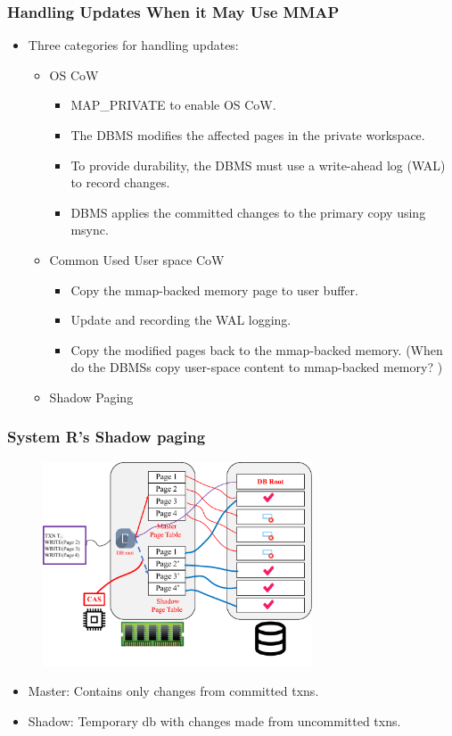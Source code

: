 \documentclass[10pt,svgnames,fragile]{beamer}
\begin{document}
\begin{frame}
	\frametitle{Handling Updates When it May Use MMAP}
	\begin{itemize}
		\item Three categories for handling updates:
		\begin{itemize}
			\item<1->[$\ast$] OS CoW
			\begin{itemize}
				\item<2->[\checkmark] MAP\_PRIVATE to enable OS CoW.
				\item<3->[\checkmark]The DBMS modifies the affected pages in the private workspace.
				\item<4->[\checkmark] To provide durability, the DBMS must use a write-ahead log (WAL) to record changes.
				\item<5->[\checkmark] DBMS applies the committed changes to the primary copy using msync.
			\end{itemize}
			\item<6->[$\ast$] Common Used User space CoW
			\begin{itemize}
				\item<7->[\checkmark] Copy the mmap-backed memory page to user buffer.
				\item<8->[\checkmark] Update and recording the WAL logging.
				\item<9->[\checkmark] Copy the modified pages back to the mmap-backed memory. (When do the DBMSs copy user-space content to mmap-backed memory? )
			\end{itemize}
			\item<10->[$\ast$]  Shadow Paging
		\end{itemize}
	\end{itemize}
\end{frame}

\begin{frame}
	\frametitle{System R's Shadow paging}
	\begin{figure}
		\includegraphics[width=8cm]{images/shadow.pdf}
	\end{figure}
	\begin{itemize}
		\item Master: Contains only changes from committed txns.
		\item Shadow: Temporary db with changes made from uncommitted txns.
	\end{itemize}
\end{frame}
\end{document}
